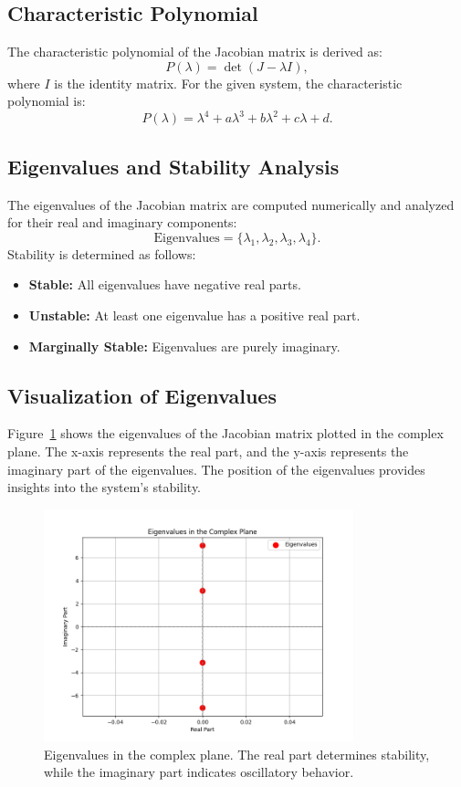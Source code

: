 \documentclass[12pt]{article}
\begin{document}
\subsection{Characteristic Polynomial}
The characteristic polynomial of the Jacobian matrix is derived as:
\[
P(\lambda) = \det(J - \lambda I),
\]
where \( I \) is the identity matrix. For the given system, the characteristic polynomial is:
\[
P(\lambda) = \lambda^4 + a \lambda^3 + b \lambda^2 + c \lambda + d.
\]

\subsection{Eigenvalues and Stability Analysis}
The eigenvalues of the Jacobian matrix are computed numerically and analyzed for their real and imaginary components:
\[
\text{Eigenvalues} = \{ \lambda_1, \lambda_2, \lambda_3, \lambda_4 \}.
\]
Stability is determined as follows:
\begin{itemize}
    \item \textbf{Stable:} All eigenvalues have negative real parts.
    \item \textbf{Unstable:} At least one eigenvalue has a positive real part.
    \item \textbf{Marginally Stable:} Eigenvalues are purely imaginary.
\end{itemize}

\subsection{Visualization of Eigenvalues}
Figure~\ref{fig:eigenvalues_complex_plane} shows the eigenvalues of the Jacobian matrix plotted in the complex plane. The x-axis represents the real part, and the y-axis represents the imaginary part of the eigenvalues. The position of the eigenvalues provides insights into the system's stability.

\begin{figure}[h!]
    \centering
    \includegraphics[width=0.8\textwidth]{eigenvalues_complex_plane.png}
    \caption{Eigenvalues in the complex plane. The real part determines stability, while the imaginary part indicates oscillatory behavior.}
    \label{fig:eigenvalues_complex_plane}
\end{figure}
\end{document}
